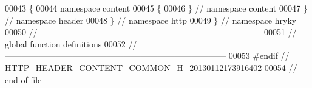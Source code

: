 \begin{DoxyCode}
00043 \{
00044 \textcolor{keyword}{namespace }content
00045 \{
00046 \} \textcolor{comment}{// namespace content}
00047 \} \textcolor{comment}{// namespace header}
00048 \} \textcolor{comment}{// namespace http}
00049 \} \textcolor{comment}{// namespace hryky}
00050 \textcolor{comment}{//
      ------------------------------------------------------------------------------}
00051 \textcolor{comment}{// global function definitions}
00052 \textcolor{comment}{//
      ------------------------------------------------------------------------------}
00053 \textcolor{preprocessor}{#endif // HTTP\_HEADER\_CONTENT\_COMMON\_H\_20130112173916402}
00054 \textcolor{preprocessor}{}\textcolor{comment}{// end of file}
\end{DoxyCode}
